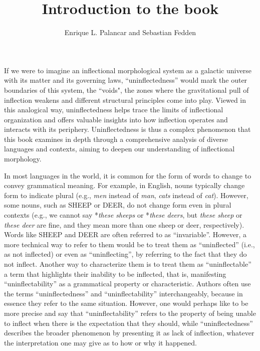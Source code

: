 \documentclass[output=paper]{langscibook}
\title{Introduction to the book}
\author{Enrique L. Palancar and Sebastian Fedden}
\begin{document}
\maketitle

\noindent If we were to imagine an inflectional morphological system as a galactic universe with its matter and its governing laws, “uninflectedness” would mark the outer boundaries of this system, the “voids", the zones where the gravitational pull of inflection weakens and different structural principles come into play. Viewed in this analogical way, uninflectedness helps trace the limits of inflectional organization and offers valuable insights into how inflection operates and interacts with its periphery. Uninflectedness is thus a complex phenomenon that this book examines in depth through a comprehensive analysis of diverse languages and contexts, aiming to deepen our understanding of inflectional morphology.

In most languages in the world, it is common for the form of words to change to convey grammatical meaning. For example, in English, nouns typically change form to indicate plural (e.g., \emph{men} instead of \emph{man}, \emph{cats} instead of \emph{cat}). However, some nouns, such as SHEEP or DEER, do not change form even in plural contexts (e.g., we cannot say *\emph{these sheeps} or *\emph{these deers}, but \emph{these sheep} or \emph{these deer} are fine, and they mean more than one sheep or deer, respectively). Words like SHEEP and DEER are often referred to as ``invariable''. However, a more technical way to refer to them would be to treat them as ``uninflected'' (i.e., as not inflected) or even as ``uninflecting'', by referring to the fact that they do not inflect. Another way to characterize them is to treat them as ``uninflectable'' a term that highlights their inability to be inflected, that is, manifesting ``uninflectability'' as a grammatical property or characteristic. Authors often use the terms ``uninflectedness'' and ``uninflectability'' interchangeably, because in essence they refer to the same situation. However, one would perhaps like to be more precise and say that ``uninflectability'' refers to the property of being unable to inflect when there is the expectation that they should, while ``uninflectedness'' describes the broader phenomenon by presenting it as lack of inflection, whatever the interpretation one may give as to how or why it happened.
\end{document}
